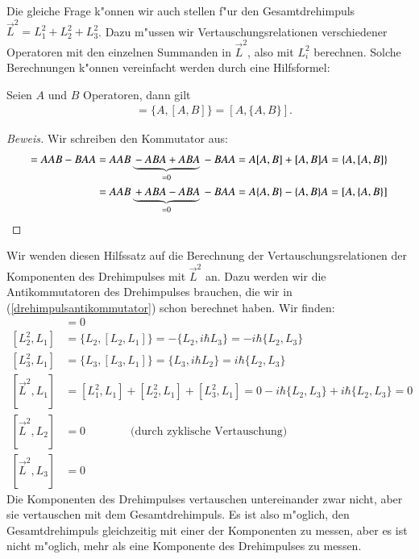 Die gleiche Frage k"onnen wir auch stellen f"ur den Gesamtdrehimpuls
$\vec L^2=L_1^2+L_2^2+L_3^2$. Dazu m"ussen wir Vertauschungsrelationen
verschiedener Operatoren mit den einzelnen Summanden in $\vec L^2$, also
mit $L_i^2$ berechnen.
Solche Berechnungen k"onnen vereinfacht werden durch eine Hilfsformel:

\begin{hilfssatz}
\label{commutatora2b}
Seien $A$ und $B$ Operatoren, dann gilt
\begin{align*}
[A^2,B]
&=
\{A,[A,B]\}
=
[A,\{A,B\}].
\end{align*}
\end{hilfssatz}

\begin{proof}[Beweis]
Wir schreiben den Kommutator aus:
\begin{align*}
[A^2,B]
=
AAB-BAA
&=
AAB\underbrace{\mathstrut -ABA+ABA}_{=0}\mathstrut -BAA
=
A[A,B]+[A,B]A
=
\{A,[A,B]\}
\\
&=
AAB\underbrace{\mathstrut +ABA-ABA}_{=0}\mathstrut -BAA
=
A\{A,B\}-\{A,B\}A
=
[A,\{A,B\}]
\end{align*}
\end{proof}

Wir wenden diesen Hilfssatz auf die Berechnung der Vertauschungsrelationen
der Komponenten des Drehimpulses mit $\vec L^2$ an.
Dazu werden wir die Antikommutatoren des Drehimpulses brauchen, die
wir in (\ref{drehimpulsantikommutator}) schon berechnet haben.
Wir finden:
\begin{align*}
[L_1^2,L_1]&=0
\\
[L_2^2,L_1]
&=
\{L_2,[L_2,L_1]\}
=
-\{L_2,i\hbar L_3\}
=-i\hbar\{L_2,L_3\}
\\
[L_3^2,L_1]
&=
\{L_3,[L_3,L_1]\}
=
\{L_3,i\hbar L_2\}
=
i\hbar\{L_2,L_3\}
\\
[\vec L^2, L_1]
&=
[L_1^2,L_1]
+
[L_2^2,L_1]
+
[L_3^2,L_1]
=
0
-i\hbar\{L_2,L_3\}
+
i\hbar\{L_2,L_3\}
=
0
\\
[\vec L^2,L_2]&=0
\qquad
\qquad
\text{(durch zyklische Vertauschung)}
\\
[\vec L^2,L_3]&=0
\end{align*}
Die Komponenten des Drehimpulses vertauschen untereinander zwar nicht,
aber sie vertauschen mit dem Gesamtdrehimpuls. Es ist also m"oglich,
den Gesamtdrehimpuls gleichzeitig mit einer der Komponenten zu messen,
aber es ist nicht m"oglich, mehr als eine Komponente des Drehimpulses
zu messen.

